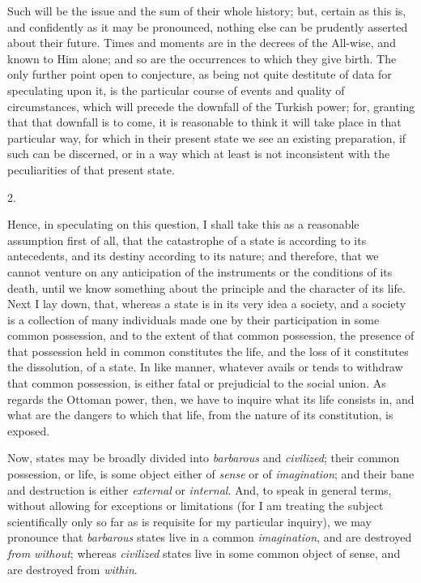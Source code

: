 Such will be the issue and the
sum of their whole history; but, certain as this is, and confidently
as it may be pronounced, nothing else can be prudently asserted about
their future. Times and moments are in the decrees of the All-wise,
and known to Him alone; and so are the occurrences to which they give
birth. The only further point open to conjecture, as being not quite
destitute of data for speculating upon it, is the particular course of
events and quality of circumstances, which will precede the downfall
of the Turkish power; for, granting that that downfall is to come, it
is reasonable to think it will take place in that particular way, for
which in their present state we see an existing preparation, if such
can be discerned, or in a way which at least is not inconsistent with
the peculiarities of that present state.

2.

Hence, in speculating on this
question, I shall take this as a reasonable assumption first of all,
that the catastrophe of a state is according to its antecedents, and
its destiny according to its nature; and therefore, that we cannot
venture on any anticipation of the instruments or the conditions of
its death, until we know something about the principle and the
character of its life. Next I lay down, that, whereas a state is in
its very idea a society, and a society is a collection of many
individuals made one by their participation in some common possession,
and to the extent of that common possession, the presence of that
possession held in common constitutes the life, and the loss of it
constitutes the dissolution, of a state. In like manner, whatever
avails or tends to withdraw that common possession, is either fatal or
prejudicial to the social union. As regards the Ottoman power,
then, we have to inquire what its life consists in, and what are the
dangers to which that life, from the nature of its constitution, is
exposed.

Now, states may be broadly
divided into \emph{barbarous} and \emph{civilized}; their common
possession, or life, is some object either of \emph{sense} or of \emph{imagination};
and their bane and destruction is either \emph{external} or \emph{internal}.
And, to speak in general terms, without allowing for exceptions or
limitations (for I am treating the subject scientifically only so far
as is requisite for my particular inquiry), we may pronounce that \emph{barbarous}
states live in a common \emph{imagination}, and are destroyed \emph{from
without}; whereas \emph{civilized} states live in some common
object of sense, and are destroyed from \emph{within}.

